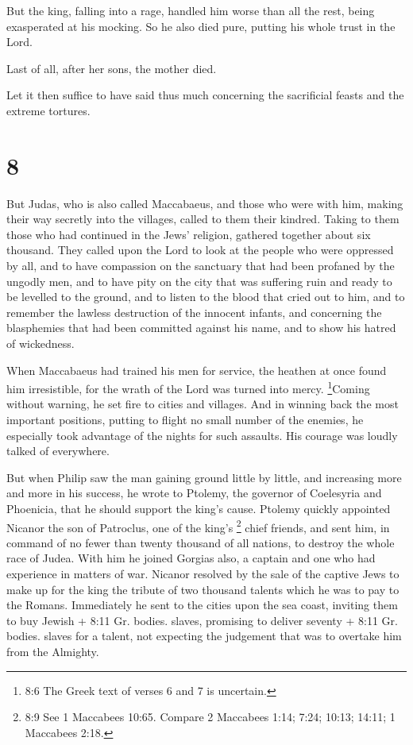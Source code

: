  But the king, falling into a rage, handled him worse than
all the rest, being exasperated at his mocking.  So he also
died pure, putting his whole trust in the Lord.

 Last of all, after her sons, the mother died.

 Let it then suffice to have said thus much concerning the
sacrificial feasts and the extreme tortures.

\hypertarget{section-7}{%
\section{8}\label{section-7}}

 But Judas, who is also called Maccabaeus, and those who
were with him, making their way secretly into the villages, called to
them their kindred. Taking to them those who had continued in the Jews'
religion, gathered together about six thousand.  They called
upon the Lord to look at the people who were oppressed by all, and to
have compassion on the sanctuary that had been profaned by the ungodly
men,  and to have pity on the city that was suffering ruin
and ready to be levelled to the ground, and to listen to the blood that
cried out to him,  and to remember the lawless destruction
of the innocent infants, and concerning the blasphemies that had been
committed against his name, and to show his hatred of wickedness.

 When Maccabaeus had trained his men for service, the
heathen at once found him irresistible, for the wrath of the Lord was
turned into mercy.  \footnote{8:6 The Greek text of verses 6
  and 7 is uncertain.}Coming without warning, he set fire to cities and
villages. And in winning back the most important positions, putting to
flight no small number of the enemies,  he especially took
advantage of the nights for such assaults. His courage was loudly talked
of everywhere.

 But when Philip saw the man gaining ground little by
little, and increasing more and more in his success, he wrote to
Ptolemy, the governor of Coelesyria and Phoenicia, that he should
support the king's cause.  Ptolemy quickly appointed Nicanor
the son of Patroclus, one of the king's \footnote{8:9 See 1 Maccabees
  10:65. Compare 2 Maccabees 1:14; 7:24; 10:13; 14:11; 1 Maccabees 2:18.}
chief friends, and sent him, in command of no fewer than twenty thousand
of all nations, to destroy the whole race of Judea. With him he joined
Gorgias also, a captain and one who had experience in matters of war.
 Nicanor resolved by the sale of the captive Jews to make
up for the king the tribute of two thousand talents which he was to pay
to the Romans.  Immediately he sent to the cities upon the
sea coast, inviting them to buy Jewish + 8:11 Gr. bodies. slaves,
promising to deliver seventy + 8:11 Gr. bodies. slaves for a talent, not
expecting the judgement that was to overtake him from the Almighty.

